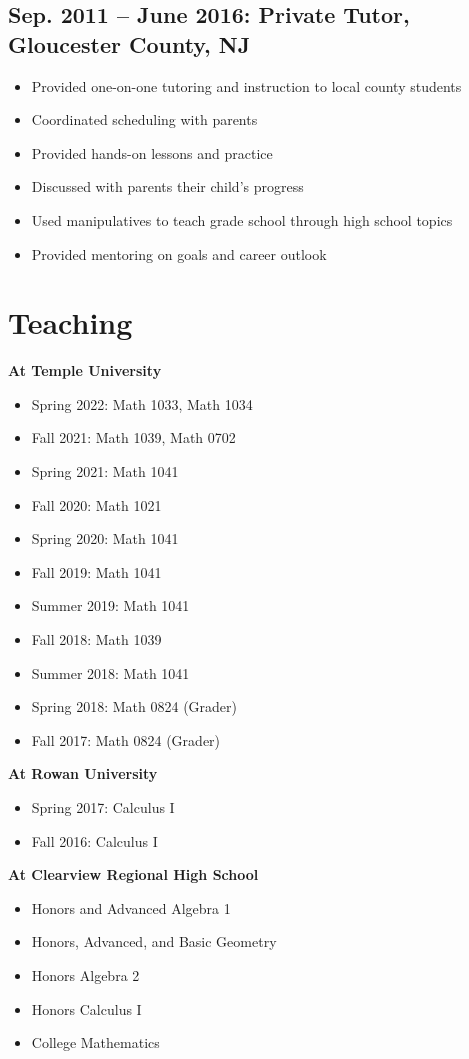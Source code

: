 \documentclass[11pt]{article}
\begin{document}
\subsection*{Sep. 2011 -- June 2016: Private Tutor, Gloucester County, NJ}
\begin{itemize}[leftmargin=*]
    \item Provided one-on-one tutoring and instruction to local county students
    \item Coordinated scheduling with parents
    \item Provided hands-on lessons and practice
    \item Discussed with parents their child's progress
    \item Used manipulatives to teach grade school through high school topics
    \item Provided mentoring on goals and career outlook
\end{itemize}

\section*{Teaching}
\textbf{At Temple University}
\begin{itemize}[leftmargin=*]
    \item Spring 2022: Math 1033, Math 1034
    \item Fall 2021: Math 1039, Math 0702
    \item Spring 2021: Math 1041
    \item Fall 2020: Math 1021
    \item Spring 2020: Math 1041
    \item Fall 2019: Math 1041
    \item Summer 2019: Math 1041
    \item Fall 2018: Math 1039
    \item Summer 2018: Math 1041
    \item Spring 2018: Math 0824 (Grader)
    \item Fall 2017: Math 0824 (Grader)
\end{itemize}

\textbf{At Rowan University}
\begin{itemize}[leftmargin=*]
    \item Spring 2017: Calculus I
    \item Fall 2016: Calculus I
\end{itemize}

\textbf{At Clearview Regional High School}
\begin{itemize}[leftmargin=*]
    \item Honors and Advanced Algebra 1
    \item Honors, Advanced, and Basic Geometry
    \item Honors Algebra 2
    \item Honors Calculus I
    \item College Mathematics
\end{itemize}
\end{document}
